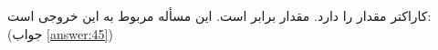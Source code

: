 \section{}
\paragraph{}\label{hint:62}
کاراکتر  مقدار  را دارد. مقدار  برابر  است. این مسأله مربوط به این خروجی است:
(جواب \ref{answer:45})
